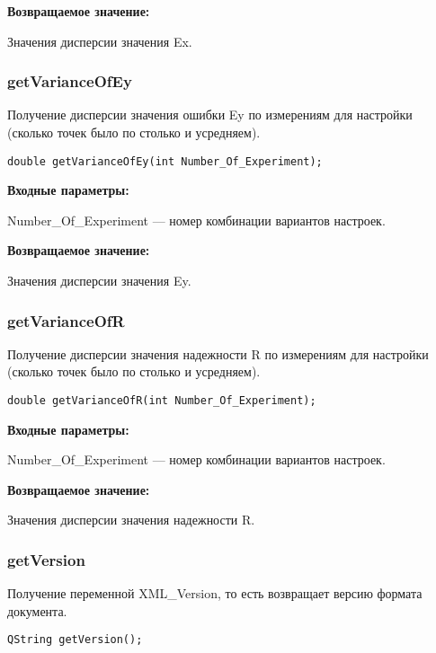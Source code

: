 \documentclass[a4paper,12pt]{article}
\begin{document}
\textbf{Возвращаемое значение:}

Значения дисперсии значения Ex.


\subsubsection{getVarianceOfEy}\label{getVarianceOfEy}

Получение дисперсии значения ошибки Ey по измерениям для настройки (сколько точек было по столько и усредняем).


\begin{lstlisting}[label=code_syntax_getVarianceOfEy,caption=Синтаксис]
double getVarianceOfEy(int Number_Of_Experiment);
\end{lstlisting}

\textbf{Входные параметры:}

Number\_Of\_Experiment --- номер комбинации вариантов настроек.

\textbf{Возвращаемое значение:}

Значения дисперсии значения Ey.


\subsubsection{getVarianceOfR}\label{getVarianceOfR}

Получение дисперсии значения надежности R по измерениям для настройки (сколько точек было по столько и усредняем).


\begin{lstlisting}[label=code_syntax_getVarianceOfR,caption=Синтаксис]
double getVarianceOfR(int Number_Of_Experiment);
\end{lstlisting}

\textbf{Входные параметры:}

Number\_Of\_Experiment --- номер комбинации вариантов настроек.

\textbf{Возвращаемое значение:}

Значения дисперсии значения надежности R.


\subsubsection{getVersion}\label{getVersion}

Получение переменной XML\_Version, то есть возвращает версию формата документа.


\begin{lstlisting}[label=code_syntax_getVersion,caption=Синтаксис]
QString getVersion();
\end{lstlisting}
\end{document}
